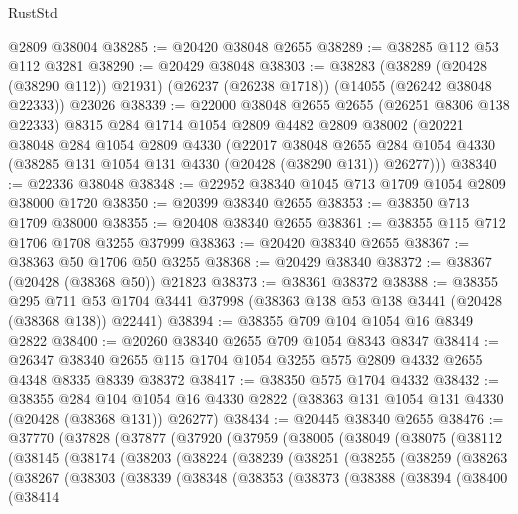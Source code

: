 \begin{lexlean}{RustStd}
\begin{coremodule}
    @2809
    @38004
@38285 := @20420 @38048 @2655
@38289 := @38285 @112 @53 @112 @3281
@38290 := @20429 @38048
@38303 := @38283
    (@38289 (@20428 (@38290 @112)) @21931)
    (@26237 (@26238 @1718))
    (@14055 (@26242 @38048 @22333))
    @23026
@38339 := @22000
    @38048
    @2655
    @2655
    (@26251 @8306 @138 @22333)
    @8315
    @284
    @1714
    @1054
    @2809
    @4482
    @2809
    @38002
    (@20221
      @38048
      @284
      @1054
      @2809
      @4330
      (@22017
        @38048
        @2655
        @284
        @1054
        @4330
        (@38285 @131 @1054 @131 @4330 (@20428 (@38290 @131)) @26277)))
@38340 := @22336 @38048
@38348 := @22952 @38340 @1045 @713 @1709 @1054 @2809 @38000 @1720
@38350 := @20399 @38340 @2655
@38353 := @38350 @713 @1709 @38000
@38355 := @20408 @38340 @2655
@38361 := @38355 @115 @712 @1706 @1708 @3255 @37999
@38363 := @20420 @38340 @2655
@38367 := @38363 @50 @1706 @50 @3255
@38368 := @20429 @38340
@38372 := @38367 (@20428 (@38368 @50)) @21823
@38373 := @38361 @38372
@38388 := @38355
    @295
    @711
    @53
    @1704
    @3441
    @37998
    (@38363 @138 @53 @138 @3441 (@20428 (@38368 @138)) @22441)
@38394 := @38355 @709 @104 @1054 @16 @8349 @2822
@38400 := @20260 @38340 @2655 @709 @1054 @8343 @8347
@38414 := @26347 @38340 @2655 @115 @1704 @1054 @3255 @575 @2809 @4332 @2655 @4348 @8335 @8339 @38372
@38417 := @38350 @575 @1704 @4332
@38432 := @38355
    @284
    @104
    @1054
    @16
    @4330
    @2822
    (@38363 @131 @1054 @131 @4330 (@20428 (@38368 @131)) @26277)
@38434 := @20445 @38340 @2655
@38476 := @37770
    (@37828
      (@37877
        (@37920
          (@37959
            (@38005
              (@38049
                (@38075
                  (@38112
                    (@38145
                      (@38174
                        (@38203
                          (@38224
                            (@38239
                              (@38251
                                (@38255
                                  (@38259
                                    (@38263
                                      (@38267
                                        (@38303
                                          (@38339
                                            (@38348
                                              (@38353
                                                (@38373
                                                  (@38388
                                                    (@38394
                                                      (@38400
                                                        (@38414

\end{coremodule}
\end{lexlean}
